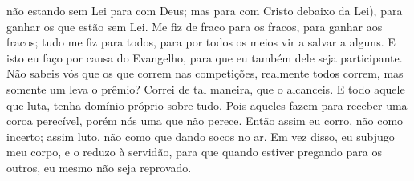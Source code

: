 {{} não estando sem Lei para com Deus; mas para com Cristo debaixo da Lei), para ganhar os que estão sem Lei.
  Me fiz de fraco para os fracos, para ganhar aos fracos; tudo me fiz para todos, para por todos os meios vir a salvar a alguns.
  E isto eu faço por causa do Evangelho, para que eu também dele seja participante.
  Não sabeis vós que os que correm nas competições, realmente todos correm, mas somente um leva o prêmio? Correi de tal maneira, que o alcanceis.
  E todo aquele que luta, tenha domínio próprio sobre tudo. Pois aqueles fazem para receber uma coroa perecível, porém nós
{} uma que não perece.
  Então assim eu corro, não como
{} incerto; assim luto, não como que dando socos no ar.
  Em vez disso, eu subjugo meu corpo, e o reduzo à servidão, para que quando estiver pregando para os outros, eu mesmo não seja reprovado.
\par }

